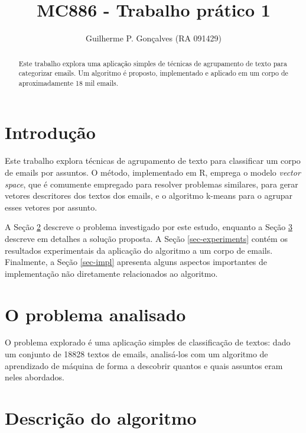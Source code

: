 \documentclass[10pt,twocolumn,letterpaper]{article}
\begin{document}
\title{MC886 - Trabalho prático 1}
\author{Guilherme P. Gonçalves (RA 091429)}

\maketitle
\begin{abstract}
Este trabalho explora uma aplicação simples de técnicas de agrupamento de texto para categorizar emails. Um algoritmo é proposto, implementado e aplicado em um corpo de aproximadamente 18 mil emails.
\end{abstract}

\section{Introdução}

Este trabalho explora técnicas de agrupamento de texto para classificar um corpo de emails por assuntos. O método, implementado em R, emprega o modelo \emph{vector space}, que é comumente empregado para resolver problemas similares\cite{Steinbach00acomparison}, para gerar vetores descritores dos textos dos emails, e o algoritmo k-means para o agrupar esses vetores por assunto.

A Seção \ref{sec-problem} descreve o problema investigado por este estudo, enquanto a Seção \ref{sec-algorithm} descreve em detalhes a solução proposta. A Seção \ref{sec-experiments} contém os resultados experimentais da aplicação do algoritmo a um corpo de emails. Finalmente, a Seção \ref{sec-impl} apresenta alguns aspectos importantes de implementação não diretamente relacionados ao algoritmo.

\section{O problema analisado}
\label{sec-problem}

O problema explorado é uma aplicação simples de classificação de textos: dado um conjunto de 18828 textos de emails, analisá-los com um algoritmo de aprendizado de máquina de forma a descobrir quantos e quais assuntos eram neles abordados.

\section{Descrição do algoritmo}
\label{sec-algorithm}
\end{document}
